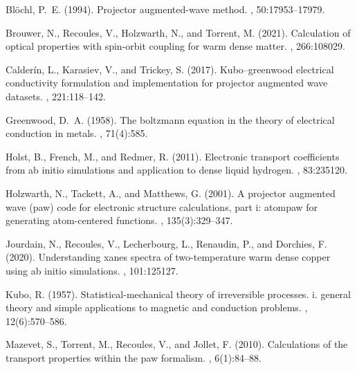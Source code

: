 \documentclass[a4,12pts]{extarticle}
\begin{document}
\begin{thebibliography}{}

Bl\"ochl, P.~E. (1994).
\newblock Projector augmented-wave method.
, 50:17953--17979.

Brouwer, N., Recoules, V., Holzwarth, N., and Torrent, M. (2021).
\newblock Calculation of optical properties with spin-orbit coupling for warm
  dense matter.
, 266:108029.

Calderín, L., Karasiev, V., and Trickey, S. (2017).
\newblock Kubo–greenwood electrical conductivity formulation and
  implementation for projector augmented wave datasets.
, 221:118--142.

Greenwood, D.~A. (1958).
\newblock The boltzmann equation in the theory of electrical conduction in
  metals.
, 71(4):585.

Holst, B., French, M., and Redmer, R. (2011).
\newblock Electronic transport coefficients from ab initio simulations and
  application to dense liquid hydrogen.
, 83:235120.

Holzwarth, N., Tackett, A., and Matthews, G. (2001).
\newblock A projector augmented wave (paw) code for electronic structure
  calculations, part i: atompaw for generating atom-centered functions.
, 135(3):329--347.

Jourdain, N., Recoules, V., Lecherbourg, L., Renaudin, P., and Dorchies, F.
  (2020).
\newblock Understanding xanes spectra of two-temperature warm dense copper
  using ab initio simulations.
, 101:125127.

Kubo, R. (1957).
\newblock Statistical-mechanical theory of irreversible processes. i. general
  theory and simple applications to magnetic and conduction problems.
, 12(6):570--586.

Mazevet, S., Torrent, M., Recoules, V., and Jollet, F. (2010).
\newblock Calculations of the transport properties within the paw formalism.
, 6(1):84--88.

\end{thebibliography}
\end{document}
